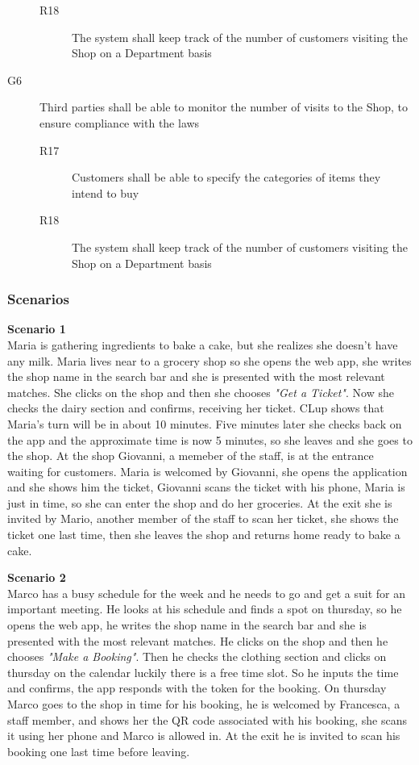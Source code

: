 \begin{description}
\begin{description}
              \item [R18] The system shall keep track of the number of customers visiting the Shop on a Department basis
          \end{description}
    \item [G6]  Third parties shall be able to monitor the number of visits to the Shop, to ensure compliance with the laws
          \begin{description}
              \item [R17] Customers shall be able to specify the categories of items they intend to buy
              \item [R18] The system shall keep track of the number of customers visiting the Shop on a Department basis
          \end{description}
\end{description}

\subsubsection{Scenarios}
\textbf{Scenario 1}\\
Maria is gathering ingredients to bake a cake, but she realizes she doesn't have any milk.
Maria lives near to a grocery shop so she opens the web app, she writes the shop name in the search bar and she is presented with the most relevant matches. She clicks on the shop and then she chooses \emph{"Get a Ticket"}. Now she checks the dairy section and confirms, receiving her ticket.
CLup shows that Maria's turn will be in about 10 minutes. Five minutes later she checks back on the app and the approximate time is now 5 minutes, so she leaves and she goes to the shop.
At the shop Giovanni, a memeber of the staff, is at the entrance waiting for customers. Maria is welcomed by Giovanni, she opens the application and she shows him the ticket, Giovanni scans the ticket with his phone, Maria is just in time, so she can enter the shop and do her groceries.
At the exit she is invited by Mario, another member of the staff to scan her ticket, she shows the ticket one last time, then she leaves the shop and returns home ready to bake a cake.

\textbf{Scenario 2}\\
Marco has a busy schedule for the week and he needs to go and get a suit for an important meeting. He looks at his schedule and finds a spot on thursday, so he opens the web app, he writes the shop name in the search bar and she is presented with the most relevant matches. He clicks on the shop and then he chooses \emph{"Make a Booking"}. Then he checks the clothing section and clicks on thursday on the calendar luckily there is a free time slot. So he inputs the time and confirms, the app responds with the token for the booking. On thursday Marco goes to the shop in time for his booking, he is welcomed by Francesca, a staff member, and shows her the QR code associated with his booking, she scans it using her phone and Marco is allowed in. At the exit he is invited to scan his booking one last time before leaving.

